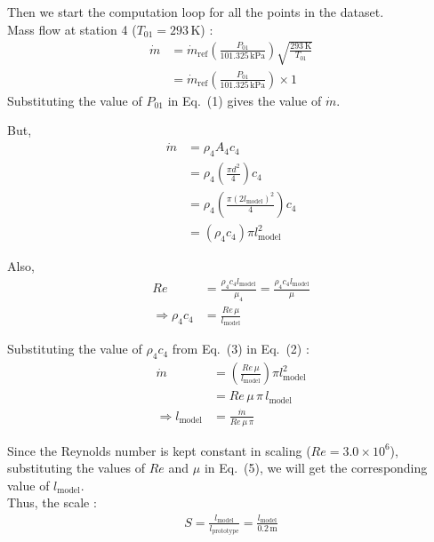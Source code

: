 \documentclass[12pt,a4paper]{article}
\begin{document}
Then we start the computation loop for all the points in the dataset.\\
Mass flow at station 4 ($T_{01}=293\,\mathrm{K}$) :
\begin{align}
  \dot{m}
    &= \dot{m}_{\mathrm{ref}} \left(\frac{P_{01}}{101.325\,\mathrm{kPa}}\right)
             \sqrt{\frac{293\,\mathrm{K}}{T_{01}}} \nonumber \\
    &= \dot{m}_{\mathrm{ref}} \left(\frac{P_{01}}{101.325\,\mathrm{kPa}}\right) \times 1
\end{align}
Substituting the value of $P_{01}$ in Eq.~(1) gives the value of $\dot{m}$.

But,
\begin{align}
  \dot{m} &= \rho_4 A_4 c_4 \nonumber \\
          &= \rho_4 \left(\frac{\pi d^2}{4}\right) c_4 \nonumber \\
          &= \rho_4 \left(\frac{\pi (2 l_{\mathrm{model}})^2}{4}\right) c_4 \nonumber \\
          &= (\rho_4 c_4) \pi l_{\mathrm{model}}^2
\end{align}

Also,
\begin{align}
  Re &= \frac{\rho_4 c_4 l_{\mathrm{model}}}{\mu_4} = \frac{\rho_4 c_4 l_{\mathrm{model}}}{\mu} \nonumber \\
  \Rightarrow \rho_4 c_4 &= \frac{Re\, \mu}{l_{\mathrm{model}}}
\end{align}

Substituting the value of $\rho_4 c_4$ from Eq.~(3) in Eq.~(2) :
\begin{align}
  \dot{m} &= \left(\frac{Re\, \mu}{l_{\mathrm{model}}}\right) \pi l_{\mathrm{model}}^2 \nonumber \\
          &= Re\, \mu\, \pi\, l_{\mathrm{model}} \nonumber \\
  \Rightarrow l_{\mathrm{model}} &= \frac{\dot{m}}{Re\, \mu\, \pi}
\end{align}

Since the Reynolds number is kept constant in scaling ($Re = 3.0 \times 10^6$), substituting the values of $Re$ and $\mu$ in Eq.~(5), we will get the corresponding value of $l_{\mathrm{model}}$.\\

Thus, the scale :
\begin{align}
S = \frac{l_{\mathrm{model}}}{l_{\mathrm{prototype}}} = \frac{l_{\mathrm{model}}}{0.2\,\mathrm{m}}
\end{align}
\end{document}
